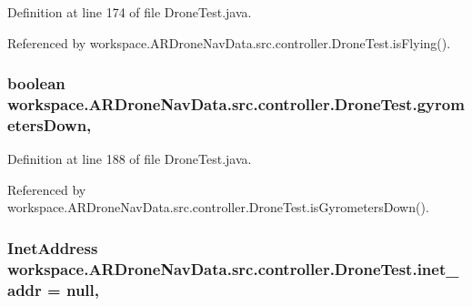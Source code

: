 Definition at line 174 of file Drone\+Test.\+java.



Referenced by workspace.\+A\+R\+Drone\+Nav\+Data.\+src.\+controller.\+Drone\+Test.\+is\+Flying().

\hypertarget{classworkspace_1_1_a_r_drone_nav_data_1_1src_1_1controller_1_1_drone_test_ae24c612b120f10081ab1524cf0a65298}{}
\subsubsection[{gyrometers\+Down}]{\setlength{\rightskip}{0pt plus 5cm}boolean workspace.\+A\+R\+Drone\+Nav\+Data.\+src.\+controller.\+Drone\+Test.\+gyrometers\+Down\hspace{0.3cm}{\ttfamily [static]}, {\ttfamily [protected]}}\label{classworkspace_1_1_a_r_drone_nav_data_1_1src_1_1controller_1_1_drone_test_ae24c612b120f10081ab1524cf0a65298}


Definition at line 188 of file Drone\+Test.\+java.



Referenced by workspace.\+A\+R\+Drone\+Nav\+Data.\+src.\+controller.\+Drone\+Test.\+is\+Gyrometers\+Down().

\hypertarget{classworkspace_1_1_a_r_drone_nav_data_1_1src_1_1controller_1_1_drone_test_ad9f584d1cccbb5569b2ad8c02f673cef}{}
\subsubsection[{inet\+\_\+addr}]{\setlength{\rightskip}{0pt plus 5cm}Inet\+Address workspace.\+A\+R\+Drone\+Nav\+Data.\+src.\+controller.\+Drone\+Test.\+inet\+\_\+addr = null\hspace{0.3cm}{\ttfamily [static]}, {\ttfamily [private]}}\label{classworkspace_1_1_a_r_drone_nav_data_1_1src_1_1controller_1_1_drone_test_ad9f584d1cccbb5569b2ad8c02f673cef}


